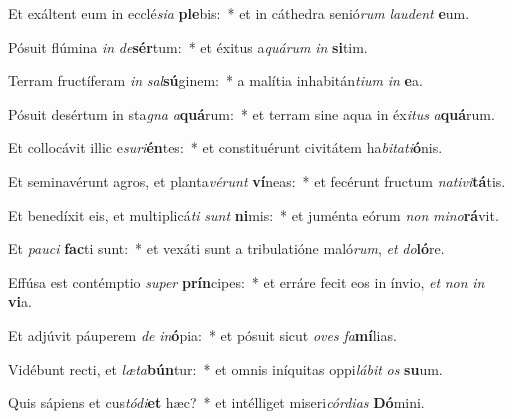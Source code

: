 \item Et exáltent eum in ecclé\textit{si}\textit{a} \textbf{ple}bis:~* et in cáthedra senió\textit{rum} \textit{lau}\textit{dent} \textbf{e}um.
\item Pósuit flúmina \textit{in} \textit{de}\textbf{sér}tum:~* et éxitus a\textit{quá}\textit{rum} \textit{in} \textbf{si}tim.
\item Terram fructíferam \textit{in} \textit{sal}\textbf{sú}ginem:~* a malítia inhabitán\textit{ti}\textit{um} \textit{in} \textbf{e}a.
\item Pósuit desértum in sta\textit{gna} \textit{a}\textbf{quá}rum:~* et terram sine aqua in éx\textit{i}\textit{tus} \textit{a}\textbf{quá}rum.
\item Et collocávit illic e\textit{su}\textit{ri}\textbf{én}tes:~* et constituérunt civitátem ha\textit{bi}\textit{ta}\textit{ti}\textbf{ó}nis.
\item Et seminavérunt agros, et planta\textit{vé}\textit{runt} \textbf{ví}neas:~* et fecérunt fructum \textit{na}\textit{ti}\textit{vi}\textbf{tá}tis.
\item Et benedíxit eis, et multiplicá\textit{ti} \textit{sunt} \textbf{ni}mis:~* et juménta eórum \textit{non} \textit{mi}\textit{no}\textbf{rá}vit.
\item Et \textit{pau}\textit{ci} \textbf{fac}ti sunt:~* et vexáti sunt a tribulatióne maló\textit{rum}, \textit{et} \textit{do}\textbf{ló}re.
\item Effúsa est contémptio \textit{su}\textit{per} \textbf{prín}cipes:~* et erráre fecit eos in ínvio, \textit{et} \textit{non} \textit{in} \textbf{vi}a.
\item Et adjúvit páuperem \textit{de} \textit{in}\textbf{ó}pia:~* et pósuit sicut \textit{o}\textit{ves} \textit{fa}\textbf{mí}lias.
\item Vidébunt recti, et \textit{læ}\textit{ta}\textbf{bún}tur:~* et omnis iníquitas oppi\textit{lá}\textit{bit} \textit{os} \textbf{su}um.
\item Quis sápiens et cus\textit{tó}\textit{di}\textbf{et} hæc?~* et intélliget miseri\textit{cór}\textit{di}\textit{as} \textbf{Dó}mini.

